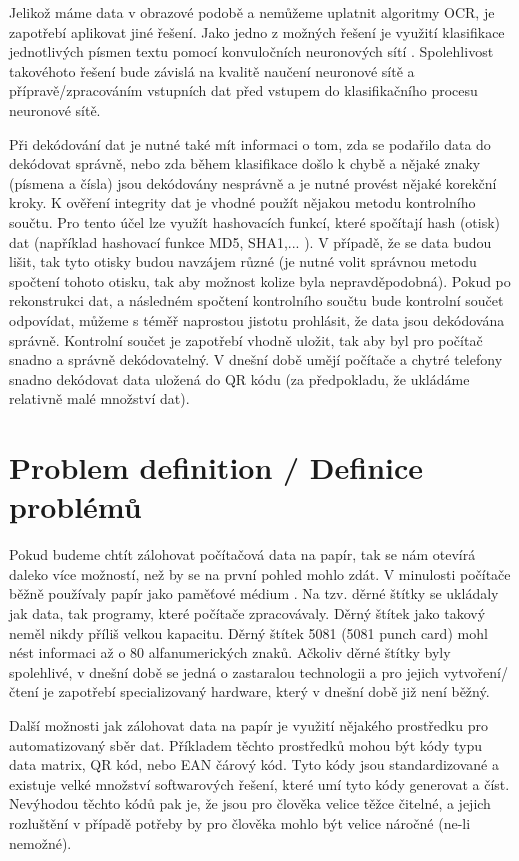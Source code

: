\documentclass[conference]{IEEEtran}
\begin{document}
Jelikož máme data v obrazové podobě a nemůžeme uplatnit algoritmy OCR, je zapotřebí aplikovat jiné řešení. Jako jedno z možných řešení je využití klasifikace jednotlivých písmen textu pomocí konvuločních neuronových sítí \cite{NIPS2010_4136}\cite{doi:10.1080/2150704X.2018.1526424}\cite{SEO2019328}. Spolehlivost takovéhoto řešení bude závislá na kvalitě naučení neuronové sítě a přípravě/zpracováním vstupních dat před vstupem do klasifikačního procesu neuronové sítě.

Při dekódování dat je nutné také mít informaci o tom, zda se podařilo data do dekódovat správně, nebo zda během klasifikace došlo k chybě a nějaké znaky (písmena a čísla) jsou dekódovány nesprávně a je nutné provést nějaké korekční kroky. K ověření integrity dat je vhodné použít nějakou metodu kontrolního součtu. Pro tento účel lze využít hashovacích funkcí, které spočítají hash (otisk) dat (například hashovací funkce MD5, SHA1,... \cite{RFC3174}). V případě, že se data budou lišit, tak tyto otisky budou navzájem různé (je nutné volit správnou metodu spočtení tohoto otisku, tak aby možnost kolize byla nepravděpodobná). Pokud po rekonstrukci dat, a následném spočtení kontrolního součtu bude kontrolní součet odpovídat, můžeme s téměř naprostou jistotu prohlásit, že data jsou dekódována správně. Kontrolní součet je zapotřebí vhodně uložit, tak aby byl pro počítač snadno a správně dekódovatelný. V dnešní době umějí počítače a chytré telefony snadno dekódovat data uložená do QR kódu (za předpokladu, že ukládáme relativně malé množství dat).

\section{Problem definition / Definice problémů}

Pokud budeme chtít zálohovat počítačová data na papír, tak se nám otevírá daleko více možností, než by se na první pohled mohlo zdát. V minulosti počítače běžně používaly papír jako paměťové médium \cite{PaperDataStorage}. Na tzv. děrné štítky se ukládaly jak data, tak programy, které počítače zpracovávaly. Děrný štítek jako takový neměl nikdy příliš velkou kapacitu. Děrný štítek 5081 (5081 punch card) mohl nést informaci až o 80 alfanumerických znaků. Ačkoliv děrné štítky byly spolehlivé, v dnešní době se jedná o zastaralou technologii a pro jejich vytvoření/čtení je zapotřebí specializovaný hardware, který v dnešní době již není běžný. 

Další možnosti jak zálohovat data na papír je využití nějakého prostředku pro automatizovaný sběr dat. Příkladem těchto prostředků mohou být kódy typu data matrix, QR kód, nebo EAN čárový kód. Tyto kódy jsou standardizované a existuje velké množství softwarových řešení, které umí tyto kódy generovat a číst. Nevýhodou těchto kódů pak je, že jsou pro člověka velice těžce čitelné, a jejich rozluštění v případě potřeby by pro člověka mohlo být velice náročné (ne-li nemožné).
\end{document}
